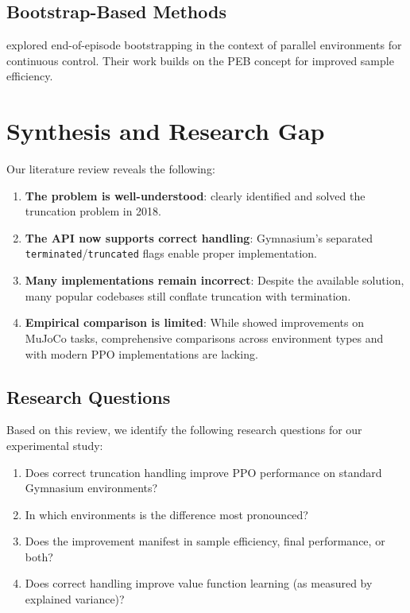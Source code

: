 \documentclass[11pt,a4paper]{article}
\begin{document}
\subsection{Bootstrap-Based Methods}

\citet{viquerat2023parallel} explored end-of-episode bootstrapping in the context of parallel environments for continuous control. Their work builds on the PEB concept for improved sample efficiency.

\section{Synthesis and Research Gap}

Our literature review reveals the following:

\begin{enumerate}
    \item \textbf{The problem is well-understood}: \citet{pardo2018time} clearly identified and solved the truncation problem in 2018.
    
    \item \textbf{The API now supports correct handling}: Gymnasium's separated \texttt{terminated}/\texttt{truncated} flags enable proper implementation.
    
    \item \textbf{Many implementations remain incorrect}: Despite the available solution, many popular codebases still conflate truncation with termination.
    
    \item \textbf{Empirical comparison is limited}: While \citet{pardo2018time} showed improvements on MuJoCo tasks, comprehensive comparisons across environment types and with modern PPO implementations are lacking.
\end{enumerate}

\subsection{Research Questions}

Based on this review, we identify the following research questions for our experimental study:

\begin{enumerate}
    \item Does correct truncation handling improve PPO performance on standard Gymnasium environments?
    \item In which environments is the difference most pronounced?
    \item Does the improvement manifest in sample efficiency, final performance, or both?
    \item Does correct handling improve value function learning (as measured by explained variance)?
\end{enumerate}
\end{document}
